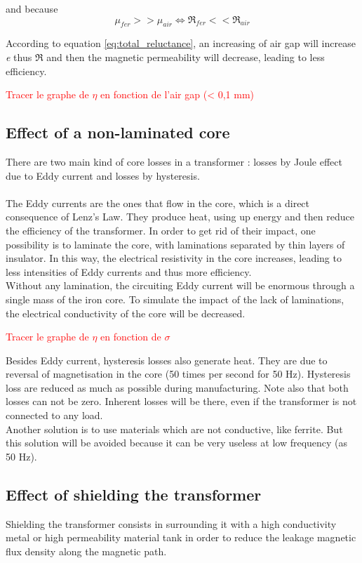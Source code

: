 \documentclass[12pt,a4paper]{report}
\begin{document}
and because 
\begin{equation}
    \mu_{fer} >> \mu_{air} \iff {\Re_{fer}} << {\Re_{air}}
\end{equation}

According to equation \ref{eq:total_reluctance}, an increasing of air gap will increase \textit{e} thus $\Re$ and then the magnetic permeability will decrease, leading to less efficiency.

\textcolor{red}{Tracer le graphe de $\eta$ en fonction de l'air gap (< 0,1 mm)}

\subsection{Effect of a non-laminated core}
There are two main kind of core losses in a transformer : losses by Joule effect due to Eddy current and losses by hysteresis.\\ \\
The Eddy currents are the ones that flow in the core, which is a direct consequence of Lenz's Law. They produce heat, using up energy and then reduce the efficiency of the transformer. In order to get rid of their impact, one possibility is to laminate the core, with laminations separated by thin layers of insulator. In this way, the electrical resistivity in the core increases, leading to less intensities of Eddy currents and thus more efficiency.\\

Without any lamination, the circuiting Eddy current will be enormous through a single mass of the iron core. To simulate the impact of the lack of laminations, the electrical conductivity of the core will be decreased.

\textcolor{red}{Tracer le graphe de $\eta$ en fonction de $\sigma$}

Besides Eddy current, hysteresis losses also generate heat. They are due to reversal of magnetisation in the core (50 times per second for 50 Hz). Hysteresis loss are reduced as much as possible during manufacturing. Note also that both losses can not be zero. Inherent losses will be there, even if the transformer is not connected to any load.\\

Another solution is to use materials which are not conductive, like ferrite.
But this solution will be avoided because it can be very useless at low frequency (as 50 Hz).

\subsection{Effect of shielding the transformer}
Shielding the transformer consists in surrounding it with a high conductivity metal or high permeability material tank in order to reduce the leakage magnetic flux density along the magnetic path.\\
\end{document}
